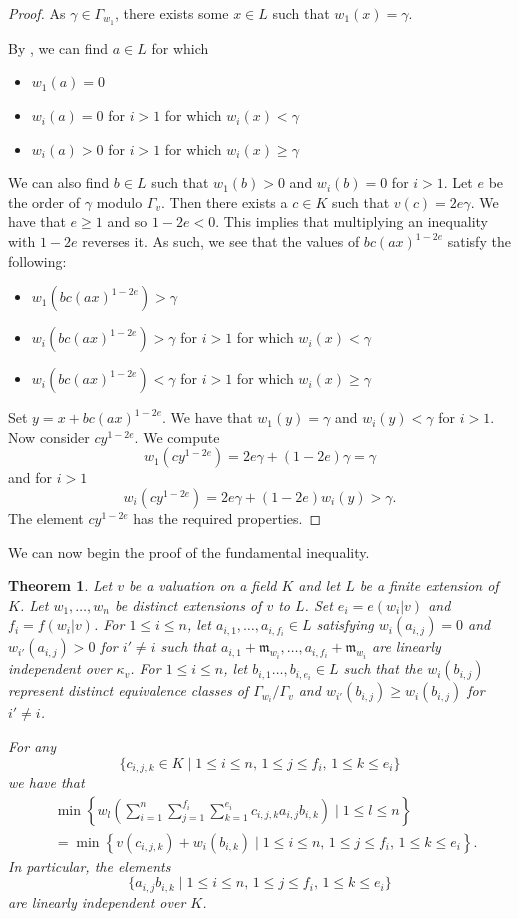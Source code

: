 \documentclass[12pt,a4paper]{amsart}
\newtheorem{thm}{Theorem}[section]
\theoremstyle{definition}
\begin{document}
\begin{proof}
As $\gamma\in\Gamma_{w_1}$, there exists some $x\in L$ such that $w_1(x)=\gamma$.

By , we can find $a\in L$ for which
\begin{itemize}
\item $w_1(a)=0$
\item $w_i(a)=0$ for $i>1$ for which $w_i(x)<\gamma$
\item $w_i(a)>0$ for $i>1$ for which $w_i(x)\geq\gamma$
\end{itemize}
We can also find $b\in L$ such that $w_1(b)>0$ and $w_i(b)=0$ for $i>1$.
Let $e$ be the order of $\gamma$ modulo $\Gamma_v$.
Then there exists a $c\in K$ such that $v(c)=2e\gamma$.
We have that $e\geq1$ and so $1-2e<0$.
This implies that multiplying an inequality with $1-2e$ reverses it.
As such, we see that the values of $bc(ax)^{1-2e}$ satisfy the following:
\begin{itemize}
\item $w_1\left(bc(ax)^{1-2e}\right)>\gamma$
\item $w_i\left(bc(ax)^{1-2e}\right)>\gamma$ for $i>1$ for which $w_i(x)<\gamma$
\item $w_i\left(bc(ax)^{1-2e}\right)<\gamma$ for $i>1$ for which $w_i(x)\geq\gamma$
\end{itemize}
Set $y=x+bc(ax)^{1-2e}$.
We have that $w_1(y)=\gamma$ and $w_i(y)<\gamma$ for $i>1$.
Now consider $cy^{1-2e}$.
We compute $$w_1\left(cy^{1-2e}\right)=2e\gamma+(1-2e)\gamma=\gamma$$
and for $i>1$
$$w_i\left(cy^{1-2e}\right)=2e\gamma+(1-2e)w_i(y)>\gamma.$$
The element $cy^{1-2e}$ has the required properties.
\end{proof}
We can now begin the proof of the fundamental inequality.
\begin{thm}{\label{fe}}
Let $v$ be a valuation on a field $K$ and let $L$ be a finite extension of $K$.
Let $w_1,\ldots,w_n$ be distinct extensions of $v$ to $L$.
Set $e_i=e(w_i|v)$ and $f_i=f(w_i|v)$.
For $1\leq i\leq n$, let $a_{i,1},\ldots,a_{i,f_i}\in L$ satisfying $w_i(a_{i,j})=0$ and $w_{i'}(a_{i,j})>0$ for $i'\neq i$ such that $a_{i,1}+\mathfrak{m}_{w_i},\ldots,a_{i,f_i}+\mathfrak{m}_{w_i}$ are linearly independent over $\kappa_v$.
For $1\leq i\leq n$, let $b_{i,1}\ldots,b_{i,e_i}\in L$ such that the $w_i(b_{i,j})$ represent distinct equivalence classes of $\Gamma_{w_i}/\Gamma_v$ and $w_{i'}(b_{i,j})\geq w_i(b_{i,j})$ for $i'\neq i$.

For any $$\{c_{i,j,k}\in K\mid 1\leq i\leq n,\, 1\leq j\leq f_i,\, 1\leq k\leq e_i\}$$
we have that
\begin{eqnarray*}
&\min\left\{w_l\left(\sum_{i=1}^n\sum_{j=1}^{f_i}\sum_{k=1}^{e_i}c_{i,j,k}a_{i,j}b_{i,k}\right)\mid1\leq l\leq n\right\}\\
&=\min\left\{v(c_{i,j,k})+w_i(b_{i,k})\mid1\leq i\leq n,\, 1\leq j\leq f_i,\, 1\leq k\leq e_i\right\}.
\end{eqnarray*}
In particular, the elements
$$\{a_{i,j}b_{i,k}\mid1\leq i\leq n,\, 1\leq j\leq f_i,\, 1\leq k\leq e_i\}$$
are linearly independent over $K$.
\end{thm}
\end{document}
